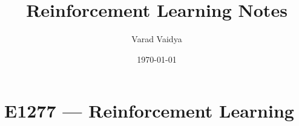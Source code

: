 \documentclass[working,a4paper,11pt]{article}
\title{Reinforcement Learning Notes}
\author{Varad Vaidya}
\date{\today}
\begin{document}
  \createintro

  \part{E1277 --- Reinforcement Learning}
  
  
\end{document}
